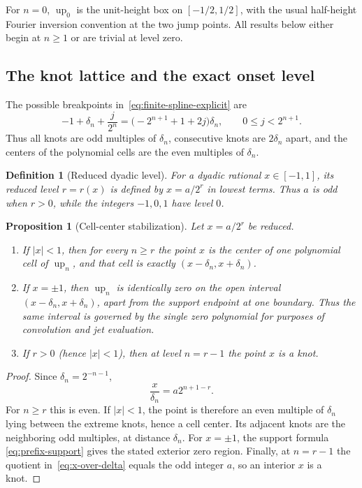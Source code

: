 \documentclass[11pt,a4paper]{article}
\newtheorem{proposition}[theorem]{Proposition}
\newtheorem{definition}[theorem]{Definition}
\theoremstyle{remark}
\newcommand{\up}{\operatorname{up}}
\begin{document}
For $n=0$, $\up_0$ is the unit-height box on $[-1/2,1/2]$, with the usual
half-height Fourier inversion convention at the two jump points.  All results
below either begin at $n\ge1$ or are trivial at level zero.

\subsection{The knot lattice and the exact onset level}

The possible breakpoints in~\eqref{eq:finite-spline-explicit} are
\begin{equation}
 -1+\delta_n+\frac{j}{2^n}
 =\bigl(-2^{n+1}+1+2j\bigr)\delta_n,
 \qquad 0\le j<2^{n+1}.
 \label{eq:knots}
\end{equation}
Thus all knots are odd multiples of $\delta_n$, consecutive knots are
$2\delta_n$ apart, and the centers of the polynomial cells are the even
multiples of $\delta_n$.

\begin{definition}[Reduced dyadic level]
\label{def:dyadic-level}
For a dyadic rational $x\in[-1,1]$, its reduced level $r=r(x)$ is defined by
$x=a/2^r$ in lowest terms.  Thus $a$ is odd when $r>0$, while the integers
$-1,0,1$ have level $0$.
\end{definition}

\begin{proposition}[Cell-center stabilization]
\label{prop:cell-center}
Let $x=a/2^r$ be reduced.

\begin{enumerate}
\item If $|x|<1$, then for every $n\ge r$ the point $x$ is the center of one
polynomial cell of $\up_n$, and that cell is exactly
$(x-\delta_n,x+\delta_n)$.
\item If $x=\pm1$, then $\up_n$ is identically zero on the open interval
$(x-\delta_n,x+\delta_n)$, apart from the support endpoint at one boundary.
Thus the same interval is governed by the single zero polynomial for purposes
of convolution and jet evaluation.
\item If $r>0$ (hence $|x|<1$), then at level $n=r-1$ the point $x$ is a knot.
\end{enumerate}
\end{proposition}

\begin{proof}
Since $\delta_n=2^{-n-1}$,
\begin{equation}
 \frac{x}{\delta_n}=a2^{n+1-r}.
 \label{eq:x-over-delta}
\end{equation}
For $n\ge r$ this is even.  If $|x|<1$, the point is therefore an even
multiple of $\delta_n$ lying between the extreme knots, hence a cell center.
Its adjacent knots are the neighboring odd multiples, at distance
$\delta_n$.  For $x=\pm1$, the support formula
\eqref{eq:prefix-support} gives the stated exterior zero region.  Finally, at
$n=r-1$ the quotient in~\eqref{eq:x-over-delta} equals the odd integer $a$,
so an interior $x$ is a knot.
\end{proof}
\end{document}
